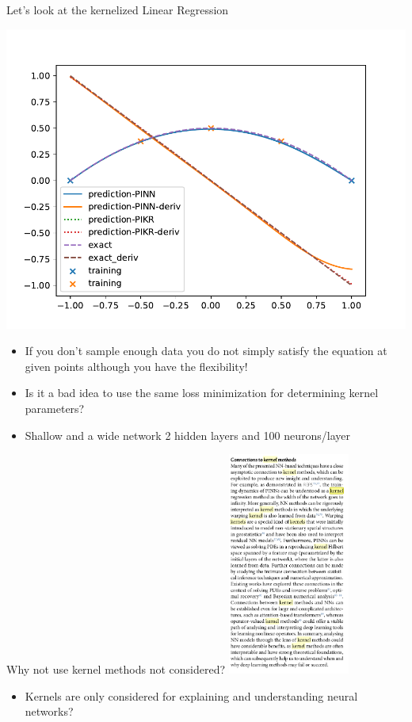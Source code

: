 \documentclass[aspectratio=169]{beamer}
\begin{document}
\begin{frame}{Let's look at the kernelized Linear Regression}
\begin{minipage}{0.3\textwidth}
    \includegraphics[width=\textwidth]{pinn-5.pdf}
  \end{minipage}
  \begin{itemize}
    \item If you don't sample enough data you do not simply satisfy the equation at given points although you have the flexibility!
    \item Is it a bad idea to use the same loss minimization for determining kernel parameters?
    \item Shallow and a wide network 2 hidden layers and 100 neurons/layer
  \end{itemize}
\end{frame}

\begin{frame}{Why not use kernel methods not considered?}
  \centering
    \includegraphics[width=0.3\textwidth]{kernel.png}
    \begin{itemize}
      \item Kernels are only considered for explaining and understanding neural networks?
    \end{itemize}
\end{frame}
\end{document}
